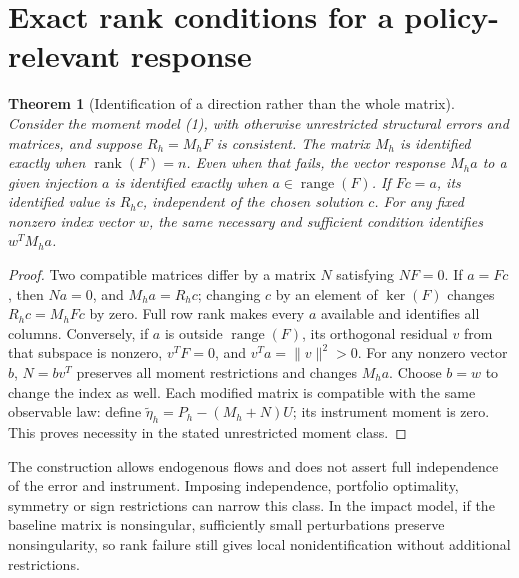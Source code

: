 \documentclass[11pt]{article}
\newtheorem{theorem}{Theorem}
\theoremstyle{remark}
\newcommand{\rank}{\operatorname{rank}}
\newcommand{\range}{\operatorname{range}}
\newcommand{\kerop}{\operatorname{ker}}
\begin{document}
\section{Exact rank conditions for a policy-relevant response}
\begin{theorem}[Identification of a direction rather than the whole matrix]
Consider the moment model (1), with otherwise unrestricted structural
errors and matrices, and suppose $R_h=M_hF$ is consistent. The matrix
$M_h$ is identified exactly when $\rank(F)=n$. Even when that fails,
the vector response $M_ha$ to a given injection $a$ is identified exactly
when $a\in\range(F)$. If $Fc=a$, its identified value is $R_hc$,
independent of the chosen solution $c$.
For any fixed nonzero index vector $w$, the same necessary and sufficient
condition identifies $w^TM_ha$.
\end{theorem}
\begin{proof}
Two compatible matrices differ by a matrix $N$ satisfying $NF=0$.
If $a=Fc$, then $Na=0$, and $M_ha=R_hc$; changing $c$ by an element
of $\kerop(F)$ changes $R_hc=M_hFc$ by zero. Full row rank makes every
$a$ available and identifies all columns. Conversely, if $a$ is outside
$\range(F)$, its orthogonal residual $v$ from that subspace is nonzero,
$v^TF=0$, and $v^Ta=\|v\|^2>0$. For any nonzero vector $b$,
$N=bv^T$ preserves all moment restrictions and changes $M_ha$.
Choose $b=w$ to change the index as well. Each modified matrix is
compatible with the same observable law: define
$\widetilde\eta_h=P_h-(M_h+N)U$; its instrument moment is zero.
This proves necessity in the stated unrestricted moment class.
\end{proof}
The construction allows endogenous flows and does not assert full
independence of the error and instrument. Imposing independence, portfolio
optimality, symmetry or sign restrictions can narrow this class. In the
impact model, if the baseline matrix is nonsingular, sufficiently small
perturbations preserve nonsingularity, so rank failure still gives local
nonidentification without additional restrictions.
\end{document}
